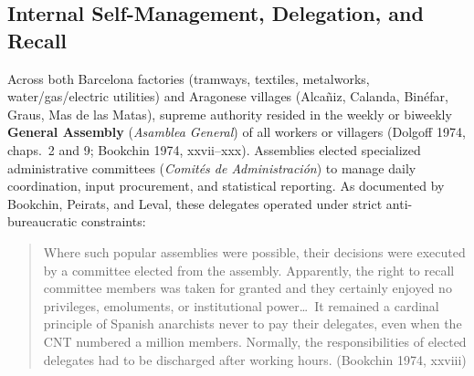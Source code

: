 \documentclass[10pt,twoside,openany]{book}
\theoremstyle{dpepstyle}
\begin{document}
\subsection{Internal Self-Management, Delegation, and Recall}
Across both Barcelona factories (tramways, textiles, metalworks, water/gas/electric utilities) and Aragonese villages (Alca\~niz, Calanda, Bin\'efar, Graus, Mas de las Matas), supreme authority resided in the weekly or biweekly \textbf{General Assembly} (\emph{Asamblea General}) of all workers or villagers (Dolgoff 1974, chaps.~2 and 9; Bookchin 1974, xxvii--xxx). Assemblies elected specialized administrative committees (\emph{Comit\'es de Administraci\'on}) to manage daily coordination, input procurement, and statistical reporting. As documented by Bookchin, Peirats, and Leval, these delegates operated under strict anti-bureaucratic constraints:
\begin{quote}
\small Where such popular assemblies were possible, their decisions were executed by a committee elected from the assembly. Apparently, the right to recall committee members was taken for granted and they certainly enjoyed no privileges, emoluments, or institutional power\dots\ It remained a cardinal principle of Spanish anarchists never to pay their delegates, even when the CNT numbered a million members. Normally, the responsibilities of elected delegates had to be discharged after working hours. (Bookchin 1974, xxviii)
\end{quote}
\end{document}
